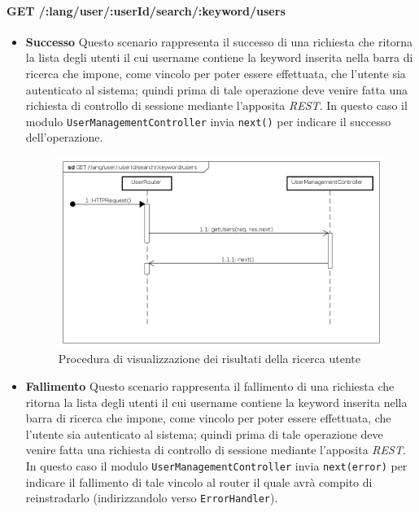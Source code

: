 \paragraph{GET /:lang/user/:userId/search/:keyword/users}
\begin{itemize}
\item \textbf{Successo}
Questo scenario rappresenta il successo di una richiesta che ritorna la lista degli utenti il cui username contiene la keyword inserita nella barra di ricerca che impone, come vincolo per poter essere effettuata, che l'utente sia autenticato al sistema; quindi prima di tale operazione deve venire fatta una richiesta di controllo di sessione mediante l'apposita \textit{REST}. In questo caso il modulo \texttt{UserManagementController} invia \texttt{next()} per indicare il successo dell'operazione.

\begin{figure}[ht]
	\centering
	\includegraphics[scale=0.45]{UML/DiagrammiDiSequenza/Back-end/GET__lang_user__userId_search__keyword_users_success.png}
	\caption{Procedura di visualizzazione dei risultati della ricerca utente}
\end{figure}
\FloatBarrier

\item \textbf{Fallimento}
Questo scenario rappresenta il fallimento di una richiesta che ritorna la lista degli utenti il cui username contiene la keyword inserita nella barra di ricerca che impone, come vincolo per poter essere effettuata, che l'utente sia autenticato al sistema; quindi prima di tale operazione deve venire fatta una richiesta di controllo di sessione mediante l'apposita \textit{REST}. In questo caso il modulo \texttt{UserManagementController} invia \texttt{next(error)} per indicare il fallimento di tale vincolo al router il quale avrà compito di reinstradarlo (indirizzandolo verso \texttt{ErrorHandler}).


\end{itemize}
